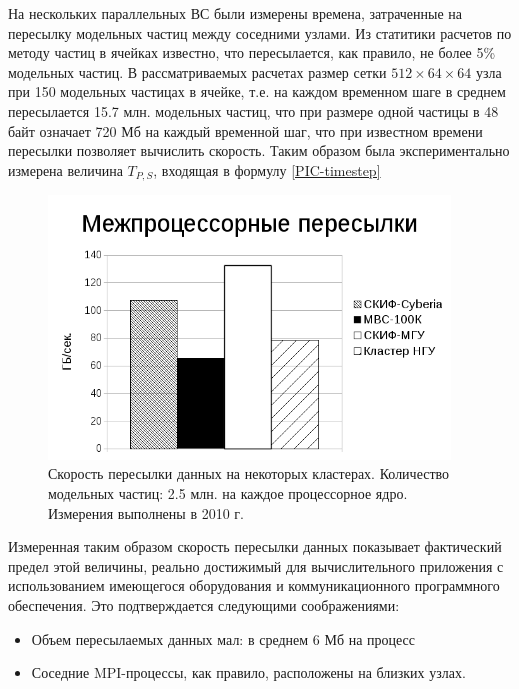 		На нескольких параллельных ВС были измерены времена, затраченные на пересылку модельных частиц между соседними узлами. Из статитики расчетов по методу частиц в ячейках известно, что пересылается, как правило, не более 5\% модельных частиц. В рассматриваемых расчетах размер сетки $512\times 64 \times 64$ узла  при 150 модельных частицах в ячейке, т.е.  на каждом временном шаге в среднем пересылается 15.7 млн. модельных частиц, что при размере одной частицы в 48 байт означает 720 Мб на каждый временной шаг, что при известном времени пересылки позволяет вычислить скорость. Таким образом была экспериментально измерена величина $T_{P,S}$, входящая в формулу \ref{PIC-timestep}   
			
			\begin{figure}[htb]
				\begin{center}
					\includegraphics[height=7cm,keepaspectratio]{images/particle_send_GBsec.png}
				\end{center}
				\caption{Скорость пересылки данных на некоторых кластерах. Количество модельных частиц: 2.5 млн. на каждое процессорное ядро. Измерения выполнены в 2010 г.}
				\label{procs_flops}
			\end{figure}
			
			Измеренная таким образом скорость пересылки данных показывает фактический предел этой величины, реально достижимый для вычислительного приложения с использованием имеющегося оборудования и коммуникационного программного обеспечения. Это подтверждается следующими соображениями:
			\begin{itemize}
				\item Объем пересылаемых данных мал: в среднем 6 Мб на процесс
				\item Соседние MPI-процессы, как правило, расположены на близких узлах.
			\end{itemize}  	 
			
